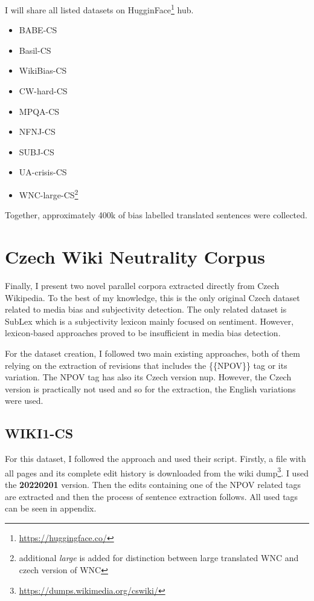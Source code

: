 I will share all listed datasets on HugginFace\footnote{\url{https://huggingface.co/}} hub.

\begin{itemize}
    \item BABE-CS
    \item Basil-CS
    \item WikiBias-CS
    \item CW-hard-CS
    \item MPQA-CS
    \item NFNJ-CS
    \item SUBJ-CS
    \item UA-crisis-CS
    \item WNC-large-CS\footnote{additional \textit{large} is added for distinction between large translated WNC and czech version of WNC}
\end{itemize}

Together, approximately 400k of bias labelled translated sentences were collected.





\section{Czech Wiki Neutrality Corpus}
Finally, I present two novel parallel corpora extracted directly from Czech Wikipedia. To the best of my knowledge, this is the only original Czech dataset related to media bias and subjectivity detection. The only related dataset is SubLex\cite{11858/00-097C-0000-0022-FF60-B} which is a subjectivity lexicon mainly focused on sentiment. However, lexicon-based approaches proved to be insufficient in media bias detection.

For the dataset creation, I followed two main existing approaches, both of them relying on the extraction of revisions that includes the \{\{NPOV\}\} tag or its variation. The NPOV tag has also its Czech version \Gls{nup}. However, the Czech version is practically not used and so for the extraction, the English variations were used.





\subsection{WIKI1-CS}
For this dataset, I followed the \cite{aleksandrova2019multilingual} approach and used their script. Firstly, a file with all pages and its complete edit history is downloaded from the wiki dump\footnote{\url{https://dumps.wikimedia.org/cswiki/}}. I used the \textbf{20220201} version. Then the edits containing one of the NPOV related tags are extracted and then the process of sentence extraction follows. All used tags can be seen in appendix.

